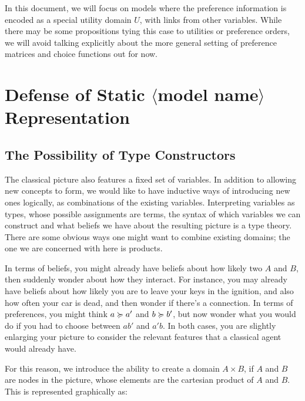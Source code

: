 \documentclass{article}
\newcommand\modelname{{\color{green!50!black}$\langle$model name$\rangle$ }}
\begin{document}
	
	
	In this document, we will focus on models where the preference information is encoded as a special utility domain $U$, with links from other variables. While there may be some propositions tying this case to utilities or preference orders, we will avoid talking explicitly about the more general setting of preference matrices and choice functions out for now.
	
	
	\section{Defense of Static \modelname Representation }
	\subsection{The Possibility of Type Constructors}\label{sec:belief-typing}
	The classical picture also features a fixed set of variables. In addition to allowing new concepts to form, we would like to have inductive ways of introducing new ones logically, as combinations of the existing variables. Interpreting variables as types, whose possible assignments are terms, the syntax of which variables we can construct and what beliefs we have about the resulting picture is a type theory. There are some obvious ways one might want to combine existing domains; the one we are concerned with here is products.
	
	In terms of beliefs, you might already have beliefs about how likely two  $A$ and $B$, then suddenly wonder about how they interact. For instance, you may already have beliefs about how likely you are to leave your keys in the ignition, and also how often your car is dead, and then wonder if there's a connection. 
	In terms of preferences, you might think $a \succcurlyeq a'$ and $b \succcurlyeq b'$, but now wonder what you would do if you had to choose between $a b'$ and $a' b$. In both cases, you are slightly enlarging your picture to consider the relevant features that a classical agent would already have.
	
	For this reason, we introduce the ability to create a domain $A \times B$, if $A$ and $B$ are nodes in the picture, whose elements are the cartesian product of $A$ and $B$. %
	This is represented graphically as:
	\begin{center}
	\end{center}
	
\end{document}
